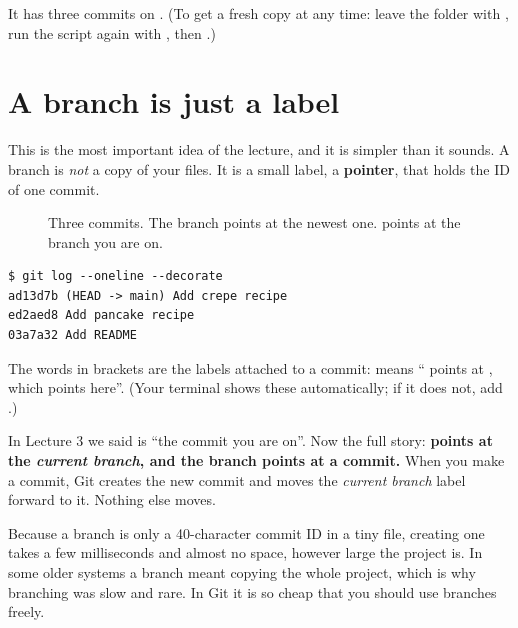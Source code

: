 It has three commits on . (To get a fresh copy at any time: leave the folder with , run the script again with , then .)

\section{A branch is just a label}

This is the most important idea of the lecture, and it is simpler than it sounds. A branch is \emph{not} a copy of your files. It is a small label, a \textbf{pointer}, that holds the ID of one commit.

\begin{figure}[H]
\centering
{}
\caption{Three commits. The branch  points at the newest one.  points at the branch you are on.}
\label{fig:pointer}
\end{figure}

\begin{lstlisting}
$ git log --oneline --decorate
ad13d7b (HEAD -> main) Add crepe recipe
ed2aed8 Add pancake recipe
03a7a32 Add README
\end{lstlisting}

The words in brackets are the labels attached to a commit:  means `` points at , which points here''. (Your terminal shows these automatically; if it does not, add .)

In Lecture 3 we said  is ``the commit you are on''. Now the full story: \textbf{ points at the \emph{current branch}, and the branch points at a commit.} When you make a commit, Git creates the new commit and moves the \emph{current branch} label forward to it. Nothing else moves.

\begin{quickfact}
Because a branch is only a 40-character commit ID in a tiny file, creating one takes a few milliseconds and almost no space, however large the project is. In some older systems a branch meant copying the whole project, which is why branching was slow and rare. In Git it is so cheap that you should use branches freely.
\end{quickfact}

